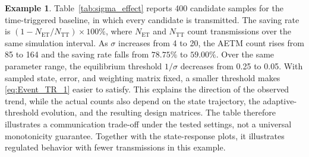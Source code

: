 \documentclass[preprint,review,fleqn,sort&compress,3p]{elsarticle}
\theoremstyle{definition} %
\theoremstyle{definition}%
\newtheorem{example}{Example}
\begin{document}
\begin{example}
Table~\ref{tab:sigma_effect} reports 400 candidate samples for the time-triggered baseline, in which every candidate is transmitted. The saving rate is $(1-N_{\mathrm{ET}}/N_{\mathrm{TT}})\times100\%$, where $N_{\mathrm{ET}}$ and $N_{\mathrm{TT}}$ count transmissions over the same simulation interval. As $\sigma$ increases from 4 to 20, the AETM count rises from 85 to 164 and the saving rate falls from $78.75\%$ to $59.00\%$. Over the same parameter range, the equilibrium threshold $1/\sigma$ decreases from 0.25 to 0.05. With sampled state, error, and weighting matrix fixed, a smaller threshold makes \eqref{eq:Event_TR_1} easier to satisfy. This explains the direction of the observed trend, while the actual counts also depend on the state trajectory, the adaptive-threshold evolution, and the resulting design matrices. The table therefore illustrates a communication trade-off under the tested settings, not a universal monotonicity guarantee. Together with the state-response plots, it illustrates regulated behavior with fewer transmissions in this example.

\end{example}
\end{document}
